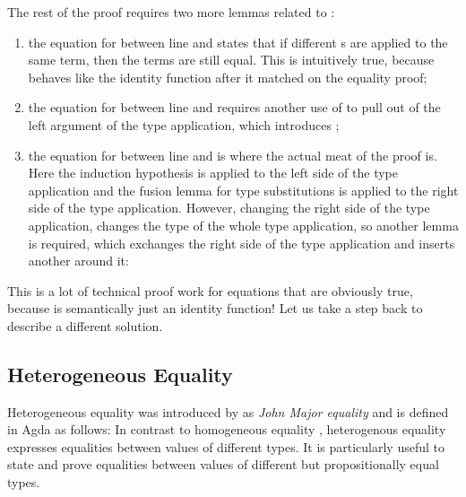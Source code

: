 \documentclass[acmsmall,anonymous,review,screen]{acmart}
\newenvironment{AgdaBlock}{%
  \vspace{\AgdaEmptySkip}%
  \AgdaNoSpaceAroundCode{}%
}{%
  \AgdaSpaceAroundCode{}
}
\begin{document}

The rest of the proof requires two more lemmas related to {\Asubst}:
\begin{enumerate}
\item the equation for {} between line  and  states that if
  different {\Asubst}s are applied to the same term, then the terms are still equal.
  This is intuitively true, because {\Asubst} behaves like the identity function
  after it matched on the equality proof;
\item the equation for {} between line  and  requires another
  use of {} to pull {} out of the left
  argument of the type application, which introduces {};
\item the equation for {} between line  and  is where
  the actual meat of the proof is. Here the induction hypothesis is applied to the
  left side of the type application and the fusion lemma for type substitutions
  is applied to the right side of the type application. However, changing
  the right side of the type application, changes the type of the
  whole type application, so another {\Asubst} lemma is required, which exchanges
  the right side of the type application and inserts another {\Asubst}
  {} around it:
  \begin{AgdaBlock}
    \SubstExamplesCongTApp
    \SubstExamplesFusionESubESubBodyProofD
  \end{AgdaBlock}
\end{enumerate}

This is a lot of technical proof work for equations that are obviously
true, because {\Asubst} is semantically just an identity function!
Let us take a step back to describe a different solution.



\subsection{Heterogeneous Equality}
\label{sec:subst-hell:het}

Heterogeneous equality was introduced by
\cite{DBLP:conf/types/McBride00} as \emph{John Major equality} and
is defined in Agda as follows:
\SubstExamplesHetEqDef
In contrast to homogeneous equality , heterogenous
equality expresses equalities between values of different
types. It is particularly useful to state and prove equalities between
values of different but propositionally equal types.
\end{document}
